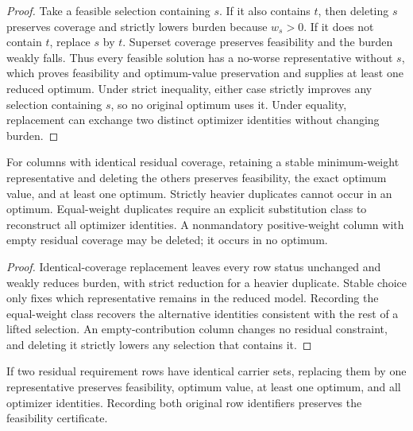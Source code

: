 \begin{proof}
Take a feasible selection containing $s$. If it also contains $t$, then
deleting $s$ preserves coverage and strictly lowers burden because
$w_s>0$. If it does not contain $t$, replace $s$ by $t$. Superset
coverage preserves feasibility and the burden weakly falls. Thus every
feasible solution has a no-worse representative without $s$, which proves
feasibility and optimum-value preservation and supplies at least one reduced
optimum. Under strict inequality, either case strictly improves any selection
containing $s$, so no original optimum uses it. Under equality, replacement
can exchange two distinct optimizer identities without changing burden.
\end{proof}

\begin{proposition}
\label{prop:or-duplicate-empty-columns}
For columns with identical residual coverage, retaining a stable
minimum-weight representative and deleting the others preserves feasibility,
the exact optimum value, and at least one optimum. Strictly heavier duplicates
cannot occur in an optimum. Equal-weight duplicates require an explicit
substitution class to reconstruct all optimizer identities. A nonmandatory
positive-weight column with empty residual coverage may be deleted; it occurs
in no optimum.
\end{proposition}

\begin{proof}
Identical-coverage replacement leaves every row status unchanged and weakly
reduces burden, with strict reduction for a heavier duplicate. Stable choice
only fixes which representative remains in the reduced model. Recording the
equal-weight class recovers the alternative identities consistent with the
rest of a lifted selection. An empty-contribution column changes no residual
constraint, and deleting it strictly lowers any selection that contains it.
\end{proof}

\begin{proposition}
\label{prop:or-duplicate-requirements}
If two residual requirement rows have identical carrier sets, replacing them
by one representative preserves feasibility, optimum value, at least one
optimum, and all optimizer identities. Recording both original row identifiers
preserves the feasibility certificate.
\end{proposition}

